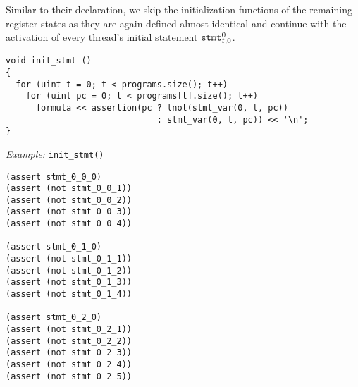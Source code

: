 
\noindent
Similar to their declaration, we skip the initialization functions of the remaining register states as they are again defined almost identical and continue with the activation of every thread's initial statement $\texttt{stmt}^0_{t, 0}$.
\begin{lstlisting}[style=c++]
void init_stmt ()
{
  for (uint t = 0; t < programs.size(); t++)
    for (uint pc = 0; t < programs[t].size(); t++)
      formula << assertion(pc ? lnot(stmt_var(0, t, pc))
                              : stmt_var(0, t, pc)) << '\n';
}
\end{lstlisting}

\noindent
\emph{Example:} \lstinline[style=c++]{init_stmt()}

\begin{lstlisting}[language=SMTLib]
(assert stmt_0_0_0)
(assert (not stmt_0_0_1))
(assert (not stmt_0_0_2))
(assert (not stmt_0_0_3))
(assert (not stmt_0_0_4))

(assert stmt_0_1_0)
(assert (not stmt_0_1_1))
(assert (not stmt_0_1_2))
(assert (not stmt_0_1_3))
(assert (not stmt_0_1_4))

(assert stmt_0_2_0)
(assert (not stmt_0_2_1))
(assert (not stmt_0_2_2))
(assert (not stmt_0_2_3))
(assert (not stmt_0_2_4))
(assert (not stmt_0_2_5))
\end{lstlisting}

